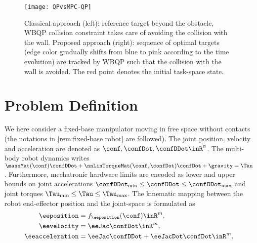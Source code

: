 \begin{figure}
	\centering
	\texttt{[image: QPvsMPC-QP]}
	\caption{Classical approach (left): reference target beyond the obstacle, WBQP collision constraint takes care of avoiding the collision with the wall. Proposed approach (right): sequence of optimal targets (edge color gradually shifts from blue to pink according to the time evolution) are tracked by WBQP such that the collision with the wall is avoided. The red point denotes the initial task-space state.}
	\label{fig:QPvsMPC-QP}
\end{figure}
\section{Problem Definition}\label{sec-chap5:problem definition}
We here consider a fixed-base manipulator moving in free space without contacts (the notations in \cref{rem:fixed-base robot} are followed). The joint position, velocity and acceleration are denoted as $\conf,\confDot,\confDDot\inR^{n}$.
The multi-body robot dynamics writes
$\massMat(\conf) \confDDot + \nnLinTorqueMat(\conf,\confDot)\confDot + \gravity  = \Tau$.
Furthermore, mechatronic hardware limits are encoded as lower and upper bounds on joint accelerations
${\confDDot}_{\min} \leq \confDDot \leq {\confDDot}_{\max}$ and joint torques
${\Tau}_{\min} \leq \Tau \leq {\Tau}_{\max}$.
The kinematic mapping between the robot end-effector position and the joint-space is formulated as
\begin{align}
	\label{eq:forward kinematics}
	\eeposition &= f_{\eeposition}(\conf)\inR^{m}, \\	
	\label{eq:forward velcotiy}\eevelocity &= \eeJac \confDot\inR^{m}, \\
	\label{eq:forward accleration}\eeacceleration &= \eeJac \confDDot + \eeJacDot \confDot\inR^{m}.
\end{align}

